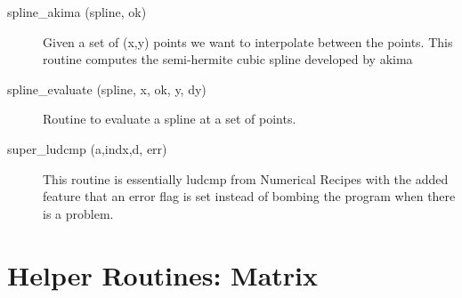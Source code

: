 \begin{description}
\label{r:spline.akima}
\item[spline_akima (spline, ok)] \Newline 
Given a set of (x,y) points we want to interpolate between the points.
This routine computes the semi-hermite cubic spline developed by akima

\label{r:spline.evaluate}
\item[spline_evaluate (spline, x, ok, y, dy)] \Newline 
Routine to evaluate a spline at a set of points.

\label{r:super.ludcmp}
\item[super_ludcmp (a,indx,d, err)] \Newline 
This routine is essentially ludcmp from Numerical Recipes with the added feature
that an error flag is set instead of bombing the program when there is a problem.

\end{description}

\section{Helper Routines: Matrix}
\label{r:helper.matrix}

